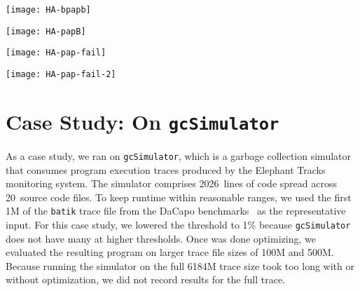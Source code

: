 \begin{figure*}
\texttt{[image: HA-bpapb]}
\label{fig:2-bangs-52-HA}
\end{figure*}

\begin{figure*}
\texttt{[image: HA-papB]}
\label{fig:2-ratio-52-HA}
\end{figure*}


\begin{figure*}
\texttt{[image: HA-pap-fail]}
\label{fig:failures-HA}
\end{figure*}

\begin{figure*}
\texttt{[image: HA-pap-fail-2]}
\label{fig:2-failures-HA}
\end{figure*}


\section{Case Study: \At{} On \texttt{gcSimulator}}
As a case study, we ran \At{} on \texttt{gcSimulator}, which is a
garbage collection simulator that consumes program execution traces
produced by the Elephant Tracks~\cite{Ricci13} monitoring system.  The
simulator comprises 2026~lines of code spread across 20~source code
files. To keep \Ao{} runtime within reasonable ranges, we used the
first 1M of the \texttt{batik} trace file from the DaCapo
benchmarks~\cite{Blackburn06} as the representative input.  For this
case study, we lowered the \absim{} threshold to 1\%
because \texttt{gcSimulator} does not have many \hotspots{} at higher
thresholds.  Once \At{} was done optimizing, we evaluated the
resulting program on larger trace file sizes of 100M and 500M. Because
running the simulator on the full 6184M trace size took too
long with or without optimization, we did not record results for the
full trace.

